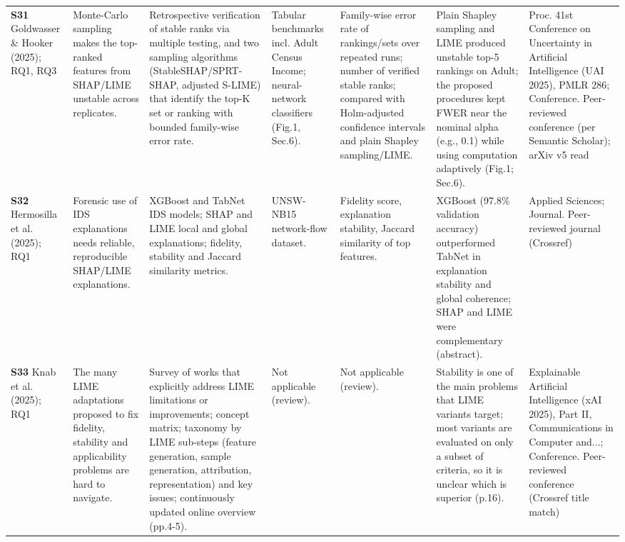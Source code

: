 \begin{longtable}{@{}P{1.55cm}P{2.9cm}P{4.5cm}P{3.2cm}P{3.4cm}P{4.6cm}P{3.6cm}@{}}
\textbf{S31} \cite{S31} Goldwasser \& Hooker (2025); RQ1, RQ3 & Monte-Carlo sampling makes the top-ranked features from SHAP/\allowbreak{}LIME unstable across replicates. & Retrospective verification of stable ranks via multiple testing, and two sampling algorithms (StableSHAP/\allowbreak{}SPRT-SHAP, adjusted S-LIME) that identify the top-K set or ranking with bounded family-wise error rate. & Tabular benchmarks incl. Adult Census Income; neural-network classifiers (Fig.1, Sec.6). & Family-wise error rate of rankings/\allowbreak{}sets over repeated runs; number of verified stable ranks; compared with Holm-adjusted confidence intervals and plain Shapley sampling/\allowbreak{}LIME. & Plain Shapley sampling and LIME produced unstable top-5 rankings on Adult; the proposed procedures kept FWER near the nominal alpha (e.g., 0.1) while using computation adaptively (Fig.1; Sec.6). & Proc. 41st Conference on Uncertainty in Artificial Intelligence (UAI 2025), PMLR 286; Conference. Peer-reviewed conference (per Semantic Scholar); arXiv v5 read \\
\textbf{S32} \cite{S32} Hermosilla et al. (2025); RQ1 & Forensic use of IDS explanations needs reliable, reproducible SHAP/\allowbreak{}LIME explanations. & XGBoost and TabNet IDS models; SHAP and LIME local and global explanations; fidelity, stability and Jaccard similarity metrics. & UNSW-NB15 network-flow dataset. & Fidelity score, explanation stability, Jaccard similarity of top features. & XGBoost (97.8\% validation accuracy) outperformed TabNet in explanation stability and global coherence; SHAP and LIME were complementary (abstract). & Applied Sciences; Journal. Peer-reviewed journal (Crossref) \\
\textbf{S33} \cite{S33} Knab et al. (2025); RQ1 & The many LIME adaptations proposed to fix fidelity, stability and applicability problems are hard to navigate. & Survey of works that explicitly address LIME limitations or improvements; concept matrix; taxonomy by LIME sub-steps (feature generation, sample generation, attribution, representation) and key issues; continuously updated online overview (pp.4-5). & Not applicable (review). & Not applicable (review). & Stability is one of the main problems that LIME variants target; most variants are evaluated on only a subset of criteria, so it is unclear which is superior (p.16). & Explainable Artificial Intelligence (xAI 2025), Part II, Communications in Computer and...; Conference. Peer-reviewed conference (Crossref title match) \\

\end{longtable}
